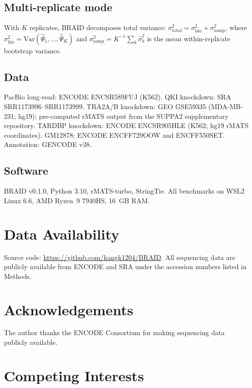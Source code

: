 \documentclass[10pt]{article}
\begin{document}
\subsection*{Multi-replicate mode}

With $K$ replicates, BRAID decomposes total variance:
$\sigma^2_{\text{total}} = \sigma^2_{\text{bio}} + \sigma^2_{\text{samp}}$,
where $\sigma^2_{\text{bio}} = \text{Var}(\hat\Psi_1, \ldots, \hat\Psi_K)$ and $\sigma^2_{\text{samp}} = K^{-1}\sum_k \hat\sigma^2_k$ is the mean within-replicate bootstrap variance.

\subsection*{Data}

PacBio long-read: ENCODE ENCSR589FUJ (K562).
QKI knockdown: SRA SRR1173996--SRR1173999\citep{hall2013}.
TRA2A/B knockdown: GEO GSE59335 (MDA-MB-231; hg19)\citep{trincado2018}; pre-computed rMATS output from the SUPPA2 supplementary repository.
TARDBP knockdown: ENCODE ENCSR905HLE (K562; hg19 rMATS coordinates).
GM12878: ENCODE ENCFF729OOW and ENCFF550SET.
Annotation: GENCODE v38.

\subsection*{Software}

BRAID v0.1.0, Python 3.10, rMATS-turbo\citep{shen2014}, StringTie\citep{pertea2015}.
All benchmarks on WSL2 Linux 6.6, AMD Ryzen~9 7940HS, 16~GB RAM.

\section*{Data Availability}

Source code: \url{https://github.com/kangk1204/BRAID}.
All sequencing data are publicly available from ENCODE and SRA under the accession numbers listed in Methods.

\section*{Acknowledgements}

The author thanks the ENCODE Consortium for making sequencing data publicly available.

\section*{Competing Interests}
\end{document}
